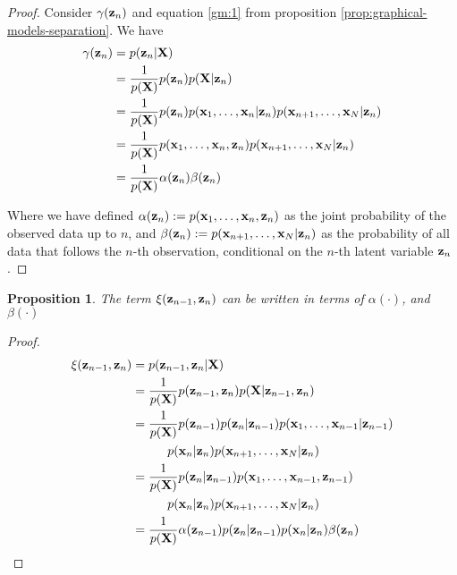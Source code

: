 \documentclass[11pt]{article}
\newtheorem{proposition}{Proposition}[section]
\begin{document}
\begin{proof}\label{prop:gamma-factorisation}
Consider  $\gamma({\bf z}_n)$ and equation \ref{gm:1} from proposition \ref{prop:graphical-models-separation}. We have
\begin{align}
	\gamma({\bf z}_n) &= p({\bf z}_n \vert {\bf X})\\
					  &= \frac{1}{p({\bf X})}p({\bf z}_n)p({\bf X} \vert {\bf z}_n)\\
					  &= \frac{1}{p({\bf X})} p({\bf z}_n) p({\bf x}_1, \ldots, {\bf x}_n\vert {\bf z}_n) p({\bf x}_{n+1}, \ldots, {\bf x}_N\vert {\bf z}_n)\\
					  &= \frac{1}{p({\bf X})}p({\bf x}_1, \ldots, {\bf x}_n, {\bf z}_n) p({\bf x}_{n+1}, \ldots, {\bf x}_N\vert {\bf z}_n)\\
					  &= \frac{1}{p({\bf X})}\alpha({\bf z}_n)\beta({\bf z}_n)
\end{align}

Where we have defined $\alpha({\bf z}_n) := p({\bf x}_1, \ldots, {\bf x}_n, {\bf z}_n)$ as the joint probability of the observed data up to $n$, and $\beta({\bf z}_n) := p({\bf x}_{n+1}, \ldots, {\bf x}_N\vert {\bf z}_n)$ as the probability of all data that follows the $n$-th observation, conditional on the $n$-th latent variable ${\bf z}_n$.
\end{proof}


\begin{proposition}\label{prop:xi-factorisation}
	The term $\xi({\bf z}_{n-1}, {\bf z}_n)$ can be written in terms of $\alpha({\cdot})$, and $\beta(\cdot)$
\end{proposition}

\begin{proof}
	\begin{align}
		\xi({\bf z}_{n-1}, {\bf z}_{n}) &= p({\bf z}_{n-1}, {\bf z}_{n} \vert {\bf X})\\
		&= \frac{1}{p({\bf X})}p({\bf z}_{n-1}, {\bf z}_{n}) p({\bf X} \vert {\bf z}_{n-1}, {\bf z}_{n})\\
		&= \frac{1}{p({\bf X})} p({\bf z}_{n-1}) p({\bf z}_{n} \vert {\bf z}_{n-1}) p({\bf x}_1, \ldots, {\bf x}_{n-1}\vert {\bf z}_{n-1}) \nonumber \\
			&\hspace{1cm} p({\bf x}_n\vert {\bf z}_n) p({\bf x}_{n+1}, \ldots, {\bf x}_N \vert {\bf z}_n)\\
		&= \frac{1}{p({\bf X})} p({\bf z}_{n} \vert {\bf z}_{n-1}) p({\bf x}_1, \ldots, {\bf x}_{n-1}, {\bf z}_{n-1}) \nonumber \\
			&\hspace{1cm} p({\bf x}_n\vert {\bf z}_n) p({\bf x}_{n+1}, \ldots, {\bf x}_N \vert {\bf z}_n)\\
		&= \frac{1}{p({\bf X})} \alpha({\bf z}_{n-1}) p({\bf z}_{n} \vert {\bf z}_{n-1}) p({\bf x}_n \vert {\bf z}_n) \beta({\bf z}_n)
	\end{align}
\end{proof}
\end{document}
